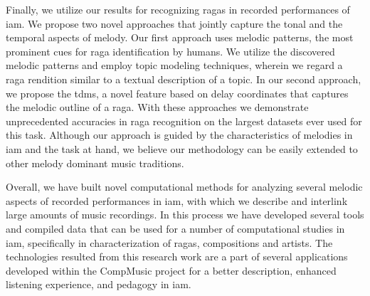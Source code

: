Finally, we utilize our results for recognizing \glspl{raga} in recorded performances of \gls{iam}. We propose two novel approaches that jointly capture the tonal and the temporal aspects of melody. Our first approach uses melodic patterns, the most prominent cues for \gls{raga} identification by humans. We utilize the discovered melodic patterns and employ topic modeling techniques, wherein we regard a \gls{raga} rendition similar to a textual description of a topic. In our second approach, we propose the \acrlong{tdms}, a novel feature based on delay coordinates that captures the melodic outline of a \gls{raga}. With these approaches we demonstrate unprecedented accuracies in \gls{raga} recognition on the largest datasets ever used for this task.  Although our approach is guided by the characteristics of melodies in \gls{iam} and the task at hand, we believe our methodology can be easily extended to other melody dominant music traditions.

Overall, we have built novel computational methods for analyzing several melodic aspects of recorded performances in \gls{iam}, with which we describe and interlink large amounts of music recordings. In this process we have developed several tools and compiled data that can be used for a number of computational studies in \gls{iam}, specifically in characterization of \glspl{raga}, compositions and artists. The technologies resulted from this research work are a part of several applications developed within the CompMusic project for a better description, enhanced listening experience, and pedagogy in \gls{iam}.


